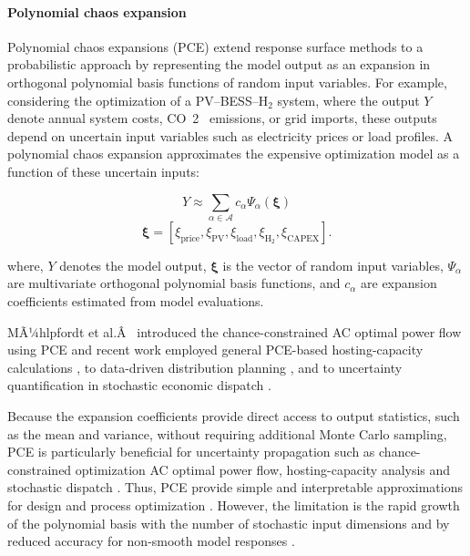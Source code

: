 \paragraph{Polynomial chaos expansion}

Polynomial chaos expansions (PCE) extend response surface methods to a
probabilistic approach by representing the model output as an expansion
in orthogonal polynomial basis functions of random input variables. For
example, considering the optimization of a PV--BESS--H$_2$ system, where
the output $Y$ denote annual system costs, CO~2~ emissions, or grid
imports, these outputs depend on uncertain input variables such as
electricity prices or load profiles. A polynomial chaos expansion
approximates the expensive optimization model as a function of these
uncertain inputs:

$$\begin{equation}
 Y \approx \sum_{\alpha \in \mathcal{A}} c_{\alpha} \Psi_{\alpha}(\boldsymbol{\xi})
\end{equation}$$ $$\begin{equation}
 \boldsymbol{\xi} = \left[ \xi_{\mathrm{price}}, \xi_{\mathrm{PV}}, \xi_{\mathrm{load}}, \xi_{\mathrm{H_2}}, \xi_{\mathrm{CAPEX}} \right].
\end{equation}$$

where, $Y$ denotes the model output, $\boldsymbol{\xi}$ is the vector of
random input variables, $\Psi_{\alpha}$ are multivariate orthogonal
polynomial basis functions, and $c_{\alpha}$ are expansion coefficients
estimated from model evaluations.

MÃ¼hlpfordt et al.Â~\cite{Muhlpfordt20194806} introduced the
chance-constrained AC optimal power flow using PCE and recent work
employed general PCE-based hosting-capacity calculations
\cite{Koirala20242284}, to data-driven distribution planning
\cite{Fu20202904,Fu2022}, and to uncertainty quantification in stochastic
economic dispatch \cite{Safta20172535}.

Because the expansion coefficients provide direct access to output
statistics, such as the mean and variance, without requiring additional
Monte Carlo sampling, PCE is particularly beneficial for uncertainty
propagation such as chance-constrained optimization AC optimal power
flow, hosting-capacity analysis and stochastic dispatch
\cite{Muhlpfordt20194806,Safta20172535,Xu20212696,Koirala20242284}.
Thus, PCE provide simple and interpretable approximations for design and
process optimization
\cite{Hasanien2018168,Sami20181416,Ahmad202451}.
However, the limitation is the rapid growth of the polynomial basis with
the number of stochastic input dimensions and by reduced accuracy for
non-smooth model responses
\cite{Muhlpfordt20194806,Safta20172535,Koirala20242284,Xu20212696}.

